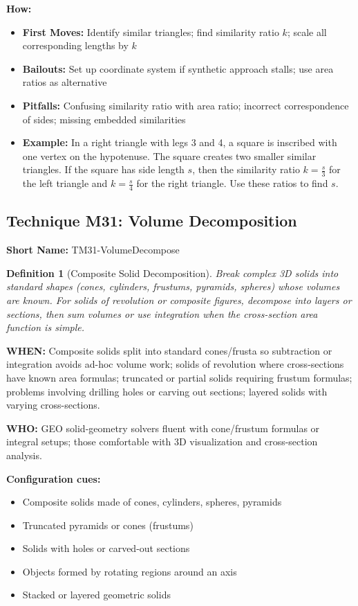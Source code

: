 \documentclass[12pt]{article}
\newtheorem{definition}{Definition}[section]
\begin{document}
\textbf{How:}
\begin{itemize}
    \item \textbf{First Moves:} Identify similar triangles; find similarity ratio $k$; scale all corresponding lengths by $k$
    \item \textbf{Bailouts:} Set up coordinate system if synthetic approach stalls; use area ratios as alternative
    \item \textbf{Pitfalls:} Confusing similarity ratio with area ratio; incorrect correspondence of sides; missing embedded similarities
    \item \textbf{Example:} In a right triangle with legs 3 and 4, a square is inscribed with one vertex on the hypotenuse. The square creates two smaller similar triangles. If the square has side length $s$, then the similarity ratio $k = \frac{s}{3}$ for the left triangle and $k = \frac{s}{4}$ for the right triangle. Use these ratios to find $s$.
\end{itemize}

\subsection{Technique M31: Volume Decomposition}
\textbf{Short Name:} TM31-VolumeDecompose

\begin{definition}[Composite Solid Decomposition]
Break complex 3D solids into standard shapes (cones, cylinders, frustums, pyramids, spheres) whose volumes are known. For solids of revolution or composite figures, decompose into layers or sections, then sum volumes or use integration when the cross-section area function is simple.
\end{definition}

\textbf{WHEN:} Composite solids split into standard cones/frusta so subtraction or integration avoids ad-hoc volume work; solids of revolution where cross-sections have known area formulas; truncated or partial solids requiring frustum formulas; problems involving drilling holes or carving out sections; layered solids with varying cross-sections.

\textbf{WHO:} GEO solid-geometry solvers fluent with cone/frustum formulas or integral setups; those comfortable with 3D visualization and cross-section analysis.

\textbf{Configuration cues:}
\begin{itemize}
    \item Composite solids made of cones, cylinders, spheres, pyramids
    \item Truncated pyramids or cones (frustums)
    \item Solids with holes or carved-out sections
    \item Objects formed by rotating regions around an axis
    \item Stacked or layered geometric solids
\end{itemize}
\end{document}

